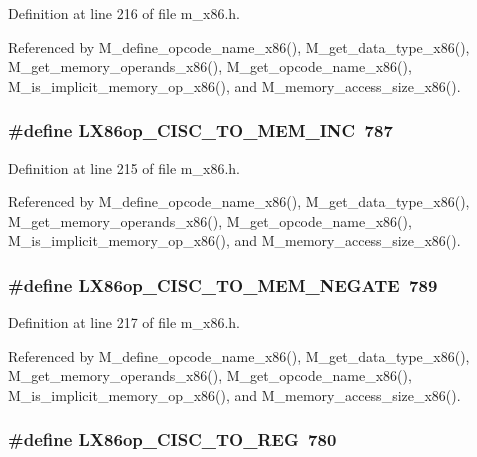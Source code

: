 Definition at line 216 of file m\_\-x86.h.

Referenced by M\_\-define\_\-opcode\_\-name\_\-x86(), M\_\-get\_\-data\_\-type\_\-x86(), M\_\-get\_\-memory\_\-operands\_\-x86(), M\_\-get\_\-opcode\_\-name\_\-x86(), M\_\-is\_\-implicit\_\-memory\_\-op\_\-x86(), and M\_\-memory\_\-access\_\-size\_\-x86().
\subsubsection{\setlength{\rightskip}{0pt plus 5cm}\#define LX86op\_\-CISC\_\-TO\_\-MEM\_\-INC~787}\label{m__x86_8h_4f94173661c2faf26d09d22daa90466b}




Definition at line 215 of file m\_\-x86.h.

Referenced by M\_\-define\_\-opcode\_\-name\_\-x86(), M\_\-get\_\-data\_\-type\_\-x86(), M\_\-get\_\-memory\_\-operands\_\-x86(), M\_\-get\_\-opcode\_\-name\_\-x86(), M\_\-is\_\-implicit\_\-memory\_\-op\_\-x86(), and M\_\-memory\_\-access\_\-size\_\-x86().
\subsubsection{\setlength{\rightskip}{0pt plus 5cm}\#define LX86op\_\-CISC\_\-TO\_\-MEM\_\-NEGATE~789}\label{m__x86_8h_b2df4c52b65fafdfdb4ead2f329de4c3}




Definition at line 217 of file m\_\-x86.h.

Referenced by M\_\-define\_\-opcode\_\-name\_\-x86(), M\_\-get\_\-data\_\-type\_\-x86(), M\_\-get\_\-memory\_\-operands\_\-x86(), M\_\-get\_\-opcode\_\-name\_\-x86(), M\_\-is\_\-implicit\_\-memory\_\-op\_\-x86(), and M\_\-memory\_\-access\_\-size\_\-x86().
\subsubsection{\setlength{\rightskip}{0pt plus 5cm}\#define LX86op\_\-CISC\_\-TO\_\-REG~780}\label{m__x86_8h_d80d10be06d236a082d385dbddd4ec3a}




